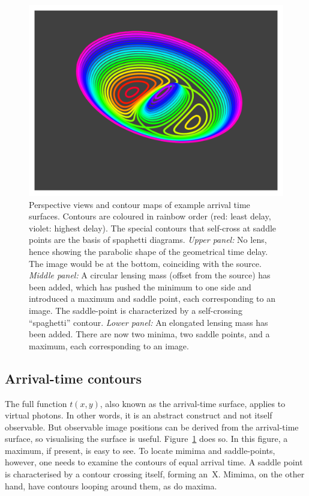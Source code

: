 \documentclass[usenatbib]{mn2e}
\newcommand{\figref}[1]{Figure~\ref{fig:#1}}
\begin{document}
\begin{figure}
\includegraphics[width=0.95\columnwidth]{fig/arriv_2}
\caption{Perspective views and contour maps of example arrival time
  surfaces.  Contours are coloured in rainbow order (red: least delay,
  violet: highest delay).  The special contours that self-cross at
  saddle points are the basis of spaphetti diagrams.  {\em Upper
    panel:\/} No lens, hence showing the parabolic shape of the
  geometrical time delay.  The image would be at the bottom,
  coinciding with the source. {\em Middle panel:\/} A circular lensing
  mass (offset from the source) has been added, which has pushed the
  minimum to one side and introduced a maximum and saddle point, each
  corresponding to an image.  The saddle-point is characterized by a
  self-crossing ``spaghetti'' contour. {\em Lower panel:\/} An
  elongated lensing mass has been added.  There are now two minima,
  two saddle points, and a maximum, each corresponding to an image.}
\label{fig:arriv}
\end{figure}



\subsection{Arrival-time contours} \label{sec:arriv}

The full function $t(x,y)$, also known as the arrival-time surface,
applies to virtual photons.  In other words, it is an abstract
construct and not itself observable.  But observable image positions
can be derived from the arrival-time surface, so visualising the
surface is useful.  \figref{arriv} does so.  In this figure, a
maximum, if present, is easy to see.  To locate mimima and
saddle-points, however, one needs to examine the contours of equal
arrival time.  A saddle point is characterised by a contour crossing
itself, forming an~X.  Mimima, on the other hand, have contours
looping around them, as do maxima.
\end{document}
